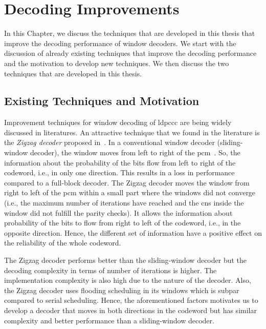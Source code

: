 \chapter{Decoding Improvements}\label{ch:dec_improve}
In this Chapter, we discuss the techniques that are developed in this thesis that improve the decoding performance of window decoders. We start with the discussion of already existing techniques that improve the decoding performance and the motivation to develop new techniques. We then discuss the two techniques that are developed in this thesis.

\section{Existing Techniques and Motivation}
Improvement techniques for window decoding of \gls{ldpccc} are being widely discussed in literatures. An attractive technique that we found in the literature is the \emph{Zigzag decoder} proposed in~\cite{Shadi2015}. In a conventional window decoder (sliding-window decoder), the window moves from left to right of the \gls{pcm}~\cite{Iyengar2012}. So, the information about the probability of the bits flow from left to right of the codeword, i.e., in only one direction. This results in a loss in performance compared to a full-block decoder. The Zigzag decoder moves the window from right to left of the \gls{pcm} within a small part where the windows did not converge (i.e., the maximum number of iterations have reached and the \glspl{cn} inside the window did not fulfill the parity checks). It allows the information about probability of the bits to flow from right to left of the codeword, i.e., in the opposite direction. Hence, the different set of information have a positive effect on the reliability of the whole codeword.

The Zigzag decoder performs better than the sliding-window decoder but the decoding complexity in terms of number of iterations is higher. The implementation complexity is also high due to the nature of the decoder. Also, the Zigzag decoder uses flooding scheduling in its windows which is subpar compared to serial scheduling. Hence, the aforementioned factors motivates us to develop a decoder that moves in both directions in the codeword but has similar complexity and better performance than a sliding-window decoder.

